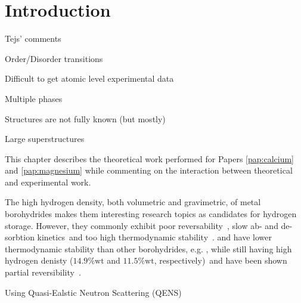 \section{Introduction}
\label{sec:borohydrides-introduction}


Tejs' comments
\bit
\item Order/Disorder transitions
\item Difficult to get atomic level experimental data
\item Multiple phases
\item Structures are not fully known (but mostly)
\item Large superstructures
\eit

This chapter describes the theoretical work performed for Papers \ref{pap:calcium} and \ref{pap:magnesium} while commenting on the interaction between theoretical and experimental work.

The high hydrogen density, both volumetric and gravimetric, of metal borohydrides makes them interesting research topics as candidates for hydrogen storage.
However, they commonly exhibit poor reversability~\citemiss, slow ab- and de-sorbtion kinetics~\citemiss and too high thermodynamic stability~\citemiss.
 and  have lower thermodynamic stability than other borohydrides, e.g. , while still having high hydrogen denisty ($14.9\%\text{wt}$ and $11.5\%\text{wt}$, respectively)~\citemiss and have been shown partial reversibility~\citemiss.


Using Quasi-Ealstic Neutron Scattering (QENS)

